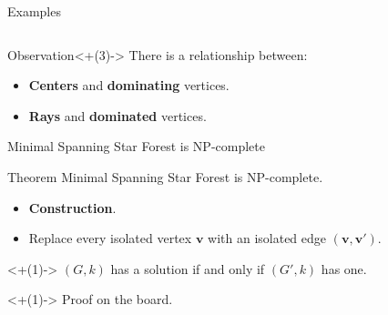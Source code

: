 \documentclass{beamer}
\begin{document}
\begin{frame}{Examples}
\begin{columns}
\begin{column}{0.5\textwidth}
		\end{column}
	\end{columns}
	\vfill
	\begin{block}{Observation}<+(3)->
		There is a relationship between:
		\setlength{\leftmargini}{20pt}
		\begin{itemize}[<+(3)->]
			\item \textbf{Centers} and \textbf{dominating} vertices.
			\item \textbf{Rays} and \textbf{dominated} vertices.
		\end{itemize}
	\end{block}
\end{frame}

\begin{frame}[t]{Minimal Spanning Star Forest is NP-complete}

	\begin{block}{Theorem}
		Minimal Spanning Star Forest is NP-complete.
	\end{block}
	\bigskip
	\setlength{\leftmargini}{2pt}
	\begin{itemize}[<+(1)->]
		\item[] \textbf{Construction}.
		\item[] Replace every isolated vertex $\mathbf{v}$ with an isolated edge $\mathbf{(v,v')}$.
	\end{itemize}

	\bigskip

	\begin{Lemma}<+(1)->
		$(G,k)$ has a solution if and only if $(G',k)$ has one.
	\end{Lemma}
	
	\onslide<+(1)-> {Proof on the board.}
\end{frame}
\end{document}
